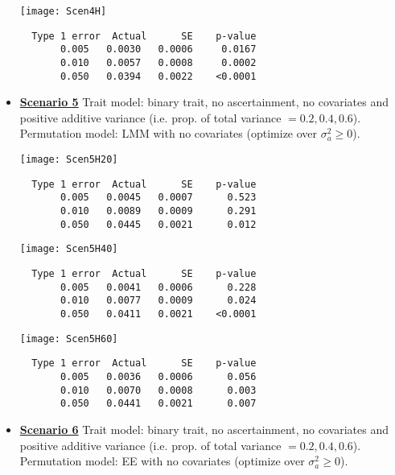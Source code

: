 \documentclass[11pt,a4paper]{article}
\begin{document}
\begin{itemize}
\begin{minipage}{.5\textwidth}
\texttt{[image: Scen4H]}
\end{minipage}
\begin{minipage}{.5\textwidth}
\begin{verbatim}
  Type 1 error  Actual      SE    p-value
       0.005   0.0030   0.0006     0.0167
       0.010   0.0057   0.0008     0.0002
       0.050   0.0394   0.0022    <0.0001
\end{verbatim}
\end{minipage}

\newpage
\item \underline{\bf Scenario 5}
Trait model: binary trait, no ascertainment, no covariates and positive additive variance (i.e. prop. of total variance $=0.2, 0.4, 0.6$).\\
Permutation model: LMM with no covariates (optimize over $\sigma_a^2\geq0$).

\begin{minipage}{.5\textwidth}
\texttt{[image: Scen5H20]}
\end{minipage}
\begin{minipage}{.5\textwidth}
\begin{verbatim}
  Type 1 error  Actual      SE    p-value
       0.005   0.0045   0.0007      0.523
       0.010   0.0089   0.0009      0.291
       0.050   0.0445   0.0021      0.012
\end{verbatim}
\end{minipage}

\begin{minipage}{.5\textwidth}
\texttt{[image: Scen5H40]}
\end{minipage}
\begin{minipage}{.5\textwidth}
\begin{verbatim}
  Type 1 error  Actual      SE    p-value
       0.005   0.0041   0.0006      0.228
       0.010   0.0077   0.0009      0.024
       0.050   0.0411   0.0021    <0.0001
\end{verbatim}
\end{minipage}

\begin{minipage}{.5\textwidth}
\texttt{[image: Scen5H60]}
\end{minipage}
\begin{minipage}{.5\textwidth}
\begin{verbatim}
  Type 1 error  Actual      SE    p-value
       0.005   0.0036   0.0006      0.056
       0.010   0.0070   0.0008      0.003
       0.050   0.0441   0.0021      0.007
\end{verbatim}
\end{minipage}
\newpage
\item \underline{\bf Scenario 6}
Trait model: binary trait, no ascertainment, no covariates and positive additive variance (i.e. prop. of total variance $=0.2, 0.4, 0.6$).\\
Permutation model: EE with no covariates (optimize over $\sigma_a^2\geq0$).


\end{itemize}
\end{document}

